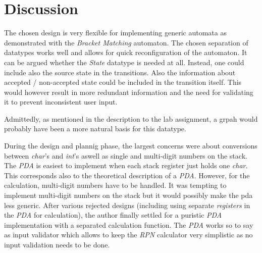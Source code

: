 \documentclass[a4paper,11pt,twoside]{article}
\begin{document}
\section{Discussion}
The chosen design is very flexible for implementing generic automata
as demonstrated with the \textit{Bracket Matching} automaton. The
chosen separation of datatypes works well and allows for quick
reconfiguration of the automaton. It can be argued whether the
\textit{State} datatype is needed at all. Instead, one could include
also the source state in the transitions. Also the information about
accepted / non-accepted state could be included in the
transition itself. This would however result in more redundant information
and the need for validating it to prevent inconsistent user input.

Admittedly, as mentioned in the description to the lab assignment, 
a grpah would probably have been a more natural basis for this
datatype. 

During the design and plannig phase, the largest concerns were about
conversions between \textit{char}'s and \textit{int}'s aswell as single
and multi-digit numbers on the stack. The \textit{PDA} is easiest to implement
when each stack register just holds one \textit{char}. This
corresponds also to the theoretical description of a
\textit{PDA}. However, for the calculation, multi-digit numbers have 
to be handled. It was tempting to implement multi-digit numbers on the
stack but it would possibly make the pda less generic. After various
rejected designs (including using separate \textit{registers} in the
\textit{PDA} for calculation), the author finally settled for a
puristic \textit{PDA} implementation with a separated calculation
function. The \textit{PDA} works so to say as input validator which
allows to keep the \textit{RPN} calculator very simplistic as no input
validation needs to be done.  



\end{document}
